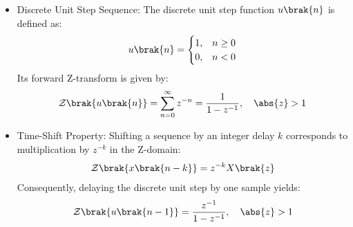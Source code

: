 \begin{enumerate}[label=\thesubsection.\arabic*, ref=\thesubsection.\theenumi,itemsep=0pt]
\begin{itemize}
\item Discrete Unit Step Sequence:
The discrete unit step function $u\brak{n}$ is defined as:
\begin{align}
u\brak{n} = \begin{cases}
1, & n \ge 0 \\
0, & n < 0
\end{cases} \label{eq:EE26BTECH11213-discrete_unit_step}
\end{align}
Its forward Z-transform is given by:
\begin{align}
\mathcal{Z}\brak{u\brak{n}} = \sum_{n=0}^{\infty} z^{-n} = \frac{1}{1 - z^{-1}}, \quad \abs{z} > 1 \label{eq:EE26BTECH11213-z_step_transform}
\end{align}

\item Time-Shift Property:
Shifting a sequence by an integer delay $k$ corresponds to multiplication by $z^{-k}$ in the Z-domain:
\begin{align}
\mathcal{Z}\brak{x\brak{n - k}} = z^{-k} X\brak{z} \label{eq:EE26BTECH11213-z_shift_property}
\end{align}
Consequently, delaying the discrete unit step by one sample yields:
\begin{align}
\mathcal{Z}\brak{u\brak{n - 1}} = \frac{z^{-1}}{1 - z^{-1}}, \quad \abs{z} > 1 \label{eq:EE26BTECH11213-z_delayed_step}
\end{align}


\end{itemize}
\end{enumerate}
